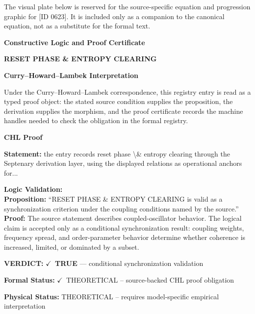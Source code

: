 \begingroup\footnotesize\sloppy
The visual plate below is reserved for the source-specific equation and progression graphic for [ID 0623]. It is included only as a companion to the canonical equation, not as a substitute for the formal text.
\par\endgroup
\ifTZPDarkEdition
{}
\fi

\clearpage
\begingroup\tzpsupportsetup
\noindent\textbf{\fontsize{10.8pt}{12.8pt}\selectfont [ID 0623] Constructive Logic and Proof Certificate}\par
\noindent\textbf{\fontsize{10pt}{12pt}\selectfont RESET PHASE \& ENTROPY CLEARING}\par
\vspace{0.45em}
\begingroup
\footnotesize
\setlength{\parskip}{0.22em}
\setlength{\parindent}{0pt}
\noindent\textbf{Curry--Howard--Lambek Interpretation}\par
Under the Curry--Howard--Lambek correspondence, this registry entry is read as a typed proof
object: the stated source condition supplies the proposition, the derivation supplies the
morphism, and the proof certificate records the machine handles needed to check the obligation
in the formal registry.

\vspace{0.45em}
\noindent\textbf{CHL Proof}\par
\textbf{Statement:} the entry records reset phase \textbackslash{}\& entropy clearing through the Septenary derivation
layer, using the displayed relations as operational anchors for...

\textbf{Logic Validation:}\\
\textbf{Proposition:} ``RESET PHASE \& ENTROPY CLEARING is valid as a synchronization criterion under the
coupling conditions named by the source.''\\
\textbf{Proof:} The source statement describes coupled-oscillator behavior. The logical claim is
accepted only as a conditional synchronization result: coupling weights, frequency
spread, and order-parameter behavior determine whether coherence is increased, limited,
or dominated by a subset.

\textbf{VERDICT:} \ensuremath{\checkmark}\ \textbf{TRUE} --- conditional synchronization validation

\textbf{Formal Status:} \ensuremath{\checkmark}\ THEORETICAL -- source-backed CHL proof obligation

\textbf{Physical Status:} THEORETICAL -- requires model-specific empirical interpretation
\par\vspace{0.45em}
\par
\ifTZPDarkEdition
{}
\fi
\endgroup
\endgroup
